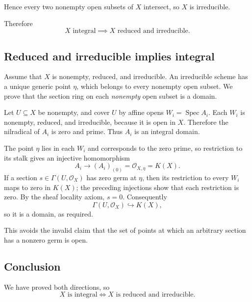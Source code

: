 Hence every two nonempty open subsets of \(X\) intersect, so \(X\) is irreducible.

Therefore
\[
X\text{ integral}
\implies
X\text{ reduced and irreducible}.
\]

\subsection*{Reduced and irreducible implies integral}

Assume that $X$ is nonempty, reduced, and irreducible. An irreducible
scheme has a unique generic point $\eta$, which belongs to every
nonempty open subset. We prove that the section ring on each
\emph{nonempty} open subset is a domain.

Let $U\subseteq X$ be nonempty, and cover $U$ by affine opens
$W_i=\operatorname{Spec}A_i$. Each $W_i$ is nonempty, reduced, and
irreducible, because it is open in $X$. Therefore the nilradical of
$A_i$ is zero and prime. Thus $A_i$ is an integral domain.

The point $\eta$ lies in each $W_i$ and corresponds to the zero
prime, so restriction to its stalk gives an injective homomorphism
\[
A_i\longrightarrow (A_i)_{(0)}=\mathcal O_{X,\eta}=K(X).
\]
If a section $s\in\Gamma(U,\mathcal O_X)$ has zero germ at $\eta$,
then its restriction to every $W_i$ maps to zero in $K(X)$; the
preceding injections show that each restriction is zero. By the sheaf
locality axiom, $s=0$. Consequently
\[
\Gamma(U,\mathcal O_X)\hookrightarrow K(X),
\]
so it is a domain, as required.

This avoids the invalid claim that the set of points at which an
arbitrary section has a nonzero germ is open.

\subsection*{Conclusion}

We have proved both directions, so
\[
\boxed{
	X\text{ is integral}
	\iff
	X\text{ is reduced and irreducible}.
}
\]
